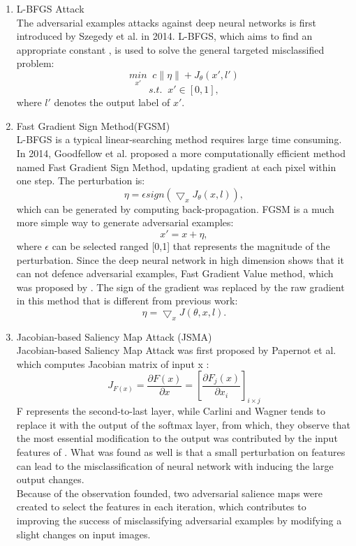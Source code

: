 \documentclass{article}
\begin{document}
\begin{enumerate}
\item L-BFGS Attack \\
The adversarial examples attacks against deep neural networks is first introduced by Szegedy et al.\cite{Szegedy42503} in 2014. L-BFGS, which aims to find an appropriate constant , is used to solve the general targeted misclassified problem:
$$\underset{x'}{min}\;\;c{\| \eta \|+ J_\theta(x',l')} $$ $$s.t.\;\; x' \in[0,1],$$
where $ l′ $ denotes the output label of $ x′ $.
\item Fast Gradient Sign Method(FGSM)\\
L-BFGS is a typical linear-searching method requires large time consuming. In 2014, Goodfellow et al.\cite{goodfellow2014explaining} proposed a more computationally efficient method named Fast Gradient Sign Method, updating gradient at each pixel within one step. The perturbation is:
$$\eta = \epsilon sign(\bigtriangledown_x{J_\theta(x,l)}),$$
which can be generated by computing back-propagation.
FGSM is a much more simple way to generate adversarial examples:$$x' = x + \eta,$$
where $\epsilon$ can be selected ranged [0,1] that represents the magnitude of the perturbation. Since the deep neural network in high dimension shows that it can not defence adversarial examples, Fast Gradient Value method, which was proposed by \cite{Rozsa}. The sign of the gradient was replaced by the raw gradient in this method that is different from previous work:
$$\eta = \bigtriangledown_xJ(\theta,x,l).$$
\item Jacobian-based Saliency Map Attack (JSMA) \\
Jacobian-based Saliency Map Attack was first proposed by Papernot et al. \cite{JSMA}which computes Jacobian matrix of input x :
$$J_{F(x)} = \frac{\partial F(x)}{\partial x} = [\frac{\partial F_j(x)}{\partial x_i}]_{i \times j}$$
F represents the second-to-last layer, while Carlini and Wagner \cite{Carlini} tends to replace it with the output of the softmax layer, from which, they observe that the most essential modification to the output was contributed by the input features of . What was found as well is that a small perturbation on features can lead to the misclassification of neural network with inducing the large output changes.\\
Because of the observation founded, two adversarial salience maps were created to select the features in each iteration, which contributes to improving the success of misclassifying adversarial examples by modifying a slight changes on input images.


\end{enumerate}
\end{document}

